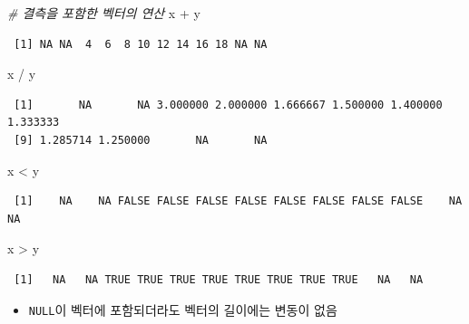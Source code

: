 \documentclass[
  11pt,
]{krantz}
\newenvironment{Shaded}{\begin{snugshade}}{\end{snugshade}}
\newcommand{\CommentTok}[1]{\textcolor[rgb]{0.37,0.37,0.37}{\textit{#1}}}
\newcommand{\NormalTok}[1]{#1}
\newcommand{\SpecialCharTok}[1]{\textcolor[rgb]{0,0,0}{#1}}
\providecommand{\tightlist}{%
  \setlength{\itemsep}{0pt}\setlength{\parskip}{0pt}}
\begin{document}
\begin{Shaded}
\begin{Highlighting}[]
\CommentTok{\# 결측을 포함한 벡터의 연산 }
\NormalTok{x }\SpecialCharTok{+}\NormalTok{ y}
\end{Highlighting}
\end{Shaded}

\begin{verbatim}
 [1] NA NA  4  6  8 10 12 14 16 18 NA NA
\end{verbatim}

\begin{Shaded}
\begin{Highlighting}[]
\NormalTok{x }\SpecialCharTok{/}\NormalTok{ y}
\end{Highlighting}
\end{Shaded}

\begin{verbatim}
 [1]       NA       NA 3.000000 2.000000 1.666667 1.500000 1.400000 1.333333
 [9] 1.285714 1.250000       NA       NA
\end{verbatim}

\begin{Shaded}
\begin{Highlighting}[]
\NormalTok{x }\SpecialCharTok{\textless{}}\NormalTok{ y}
\end{Highlighting}
\end{Shaded}

\begin{verbatim}
 [1]    NA    NA FALSE FALSE FALSE FALSE FALSE FALSE FALSE FALSE    NA    NA
\end{verbatim}

\begin{Shaded}
\begin{Highlighting}[]
\NormalTok{x }\SpecialCharTok{\textgreater{}}\NormalTok{ y}
\end{Highlighting}
\end{Shaded}

\begin{verbatim}
 [1]   NA   NA TRUE TRUE TRUE TRUE TRUE TRUE TRUE TRUE   NA   NA
\end{verbatim}

\normalsize

\begin{itemize}
\tightlist
\item
  \texttt{NULL}이 벡터에 포함되더라도 벡터의 길이에는 변동이 없음
\end{itemize}

\footnotesize
\end{document}
